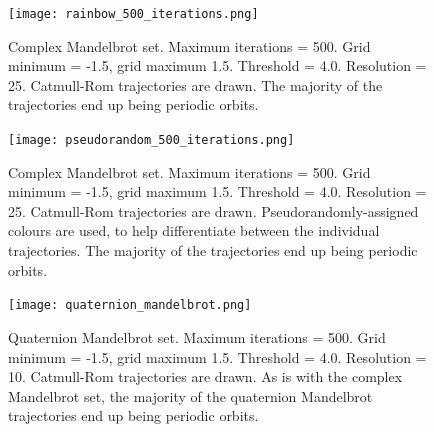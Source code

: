 \documentclass[12pt]{article}
\begin{document}
\begin{figure} 
\centering
  \texttt{[image: rainbow\_500\_iterations.png]}	
  \caption{
Complex Mandelbrot set.
Maximum iterations = 500.
Grid minimum = -1.5, grid maximum 1.5.
Threshold = 4.0. 
Resolution = 25.
Catmull-Rom trajectories are drawn.
The majority of the trajectories end up being periodic orbits.}
\end{figure}

\begin{figure} 
\centering
  \texttt{[image: pseudorandom\_500\_iterations.png]}	
  \caption{
Complex Mandelbrot set.
Maximum iterations = 500.
Grid minimum = -1.5, grid maximum 1.5.
Threshold = 4.0.
Resolution = 25.
Catmull-Rom trajectories are drawn.
Pseudorandomly-assigned colours are used, to help differentiate between the individual trajectories.
The majority of the trajectories end up being periodic orbits.}
\end{figure}


\begin{figure} 
\centering
  \texttt{[image: quaternion\_mandelbrot.png]}	
  \caption{
Quaternion Mandelbrot set.
Maximum iterations = 500.
Grid minimum = -1.5, grid maximum 1.5.
Threshold = 4.0.
Resolution = 10.
Catmull-Rom trajectories are drawn.
As is with the complex Mandelbrot set, the majority of the quaternion Mandelbrot trajectories end up being periodic orbits.}
\end{figure}
\end{document}
